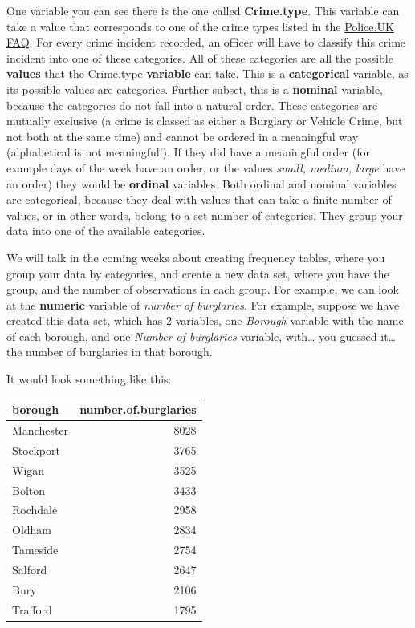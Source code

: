 \documentclass[]{book}
\theoremstyle{definition}
\theoremstyle{definition}
\theoremstyle{definition}
\theoremstyle{remark}
\begin{document}
One variable you can see there is the one called \textbf{Crime.type}.
This variable can take a value that corresponds to one of the crime
types listed in the
\href{https://www.police.uk/about-this-site/faqs/\#what-do-the-crime-categories-mean}{Police.UK
FAQ}. For every crime incident recorded, an officer will have to
classify this crime incident into one of these categories. All of these
categories are all the possible \textbf{values} that the Crime.type
\textbf{variable} can take. This is a \textbf{categorical} variable, as
its possible values are categories. Further subset, this is a
\textbf{nominal} variable, because the categories do not fall into a
natural order. These categories are mutually exclusive (a crime is
classed as either a Burglary or Vehicle Crime, but not both at the same
time) and cannot be ordered in a meaningful way (alphabetical is not
meaningful!). If they did have a meaningful order (for example days of
the week have an order, or the values \emph{small, medium, large} have
an order) they would be \textbf{ordinal} variables. Both ordinal and
nominal variables are categorical, because they deal with values that
can take a finite number of values, or in other words, belong to a set
number of categories. They group your data into one of the available
categories.

We will talk in the coming weeks about creating frequency tables, where
you group your data by categories, and create a new data set, where you
have the group, and the number of observations in each group. For
example, we can look at the \textbf{numeric} variable of \emph{number of
burglaries}. For example, suppose we have created this data set, which
has 2 variables, one \emph{Borough} variable with the name of each
borough, and one \emph{Number of burglaries} variable, with\ldots{} you
guessed it\ldots{} the number of burglaries in that borough.

It would look something like this:

\begin{tabular}{l|r}
\hline
borough & number.of.burglaries\\
\hline
Manchester & 8028\\
\hline
Stockport & 3765\\
\hline
Wigan & 3525\\
\hline
Bolton & 3433\\
\hline
Rochdale & 2958\\
\hline
Oldham & 2834\\
\hline
Tameside & 2754\\
\hline
Salford & 2647\\
\hline
Bury & 2106\\
\hline
Trafford & 1795\\
\hline
\end{tabular}
\end{document}
